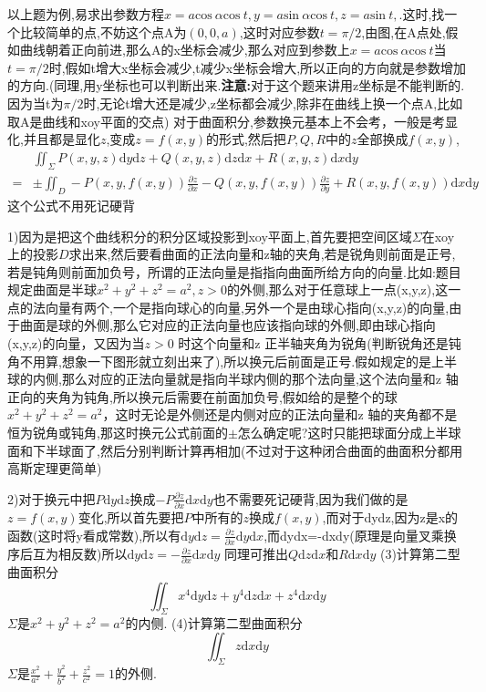 \documentclass{ctexart}
\begin{document}
以上题为例,易求出参数方程$x=a\mathrm{cos}\ \alpha\mathrm{cos}\ t,y=a\mathrm{sin}\ \alpha\mathrm{cos}\ t,
z=a\mathrm{sin}\ t,$.这时,找一个比较简单的点,不妨这个点A为$(0,0,a)$,这时对应参数$t=\pi/2$,由图,在A点处,假如曲线朝着正向前进,那么A的x坐标会减少,那么对应到参数上$x=a\mathrm{cos}\ \alpha\mathrm{cos}\ t$当$t=\pi/2$时,假如t增大x坐标会减少,t减少x坐标会增大,所以正向的方向就是参数增加的方向.(同理,用y坐标也可以判断出来.\textbf{注意:}对于这个题来讲用z坐标是不能判断的.因为当t为$\pi/2$时,无论t增大还是减少,z坐标都会减少,除非在曲线上换一个点A,比如取A是曲线和xoy平面的交点)
\newline
\newline
对于曲面积分,参数换元基本上不会考，一般是考显化,并且都是显化$z$,变成$z=f(x,y)$的形式,然后把$P,Q,R$中的$z$全部换成$f(x,y)$,
\begin{align}
\ \ &\iint_{\Sigma}P(x,y,z)\mathrm{d}y\mathrm{d}z+Q(x,y,z)\mathrm{d}z\mathrm{d}x+R(x,y,z)\mathrm{d}x\mathrm{d}y\nonumber\\
=&\pm\iint_{D}-P(x,y,f(x,y))\frac{\partial z}{\partial x}-Q(x,y,f(x,y))\frac{\partial z}{\partial y}+R(x,y,f(x,y))\mathrm{d}x\mathrm{d}y\nonumber
\end{align}
这个公式不用死记硬背

1)因为是把这个曲线积分的积分区域投影到xoy平面上,首先要把空间区域$\Sigma$在xoy上的投影$D$求出来,然后要看曲面的正法向量和z轴的夹角,若是锐角则前面是正号,若是钝角则前面加负号，所谓的正法向量是指指向曲面所给方向的向量.比如:题目规定曲面是半球$x^{2}+y^{2}+z^{2}=a^{2},z>0$的外侧,那么对于任意球上一点(x,y,z),这一点的法向量有两个,一个是指向球心的向量,另外一个是由球心指向(x,y,z)的向量,由于曲面是球的外侧,那么它对应的正法向量也应该指向球的外侧,即由球心指向(x,y,z)的向量，又因为当$z>0$ 时这个向量和z 正半轴夹角为锐角(判断锐角还是钝角不用算,想象一下图形就立刻出来了),所以换元后前面是正号.假如规定的是上半球的内侧,那么对应的正法向量就是指向半球内侧的那个法向量,这个法向量和z 轴正向的夹角为钝角,所以换元后需要在前面加负号,假如给的是整个的球$x^{2}+y^{2}+z^{2}=a^{2}$，这时无论是外侧还是内侧对应的正法向量和z 轴的夹角都不是恒为锐角或钝角,那这时换元公式前面的$\pm$怎么确定呢?这时只能把球面分成上半球面和下半球面了,然后分别判断计算再相加(不过对于这种闭合曲面的曲面积分都用高斯定理更简单)

2)对于换元中把$P\mathrm{d}y\mathrm{d}z$换成$-P\frac{\partial z}{\partial x}\mathrm{d}x\mathrm{d}y$也不需要死记硬背,因为我们做的是$z=f(x,y)$变化,所以首先要把$P$中所有的$z$换成$f(x,y)$,而对于dydz,因为z是x的函数(这时将y看成常数),所以有$\mathrm{d}y\mathrm{d}z=\frac{\partial z}{\partial x}\mathrm{d}y\mathrm{d}x$,而dydx=-dxdy(原理是向量叉乘换序后互为相反数)所以$\mathrm{d}y\mathrm{d}z=-\frac{\partial z}{\partial x}\mathrm{d}x\mathrm{d}y$
同理可推出$Q\mathrm{d}z\mathrm{d}x$和$R\mathrm{d}x\mathrm{d}y$
\newline
\newline
(3)计算第二型曲面积分$$\iint_{\Sigma}x^{4}\mathrm{d}y\mathrm{d}z+y^{4}\mathrm{d}z\mathrm{d}x+z^{4}\mathrm{d}x\mathrm{d}y$$
$\Sigma$是$x^{2}+y^{2}+z^{2}=a^{2}$的内侧.
\newline
\newline
(4)计算第二型曲面积分$$\iint_{\Sigma}z\mathrm{d}x\mathrm{d}y$$
$\Sigma$是$\frac{x^{2}}{a^{2}}+\frac{y^{2}}{b^{2}}+\frac{z^{2}}{c^{2}}=1$的外侧.
\end{document}
